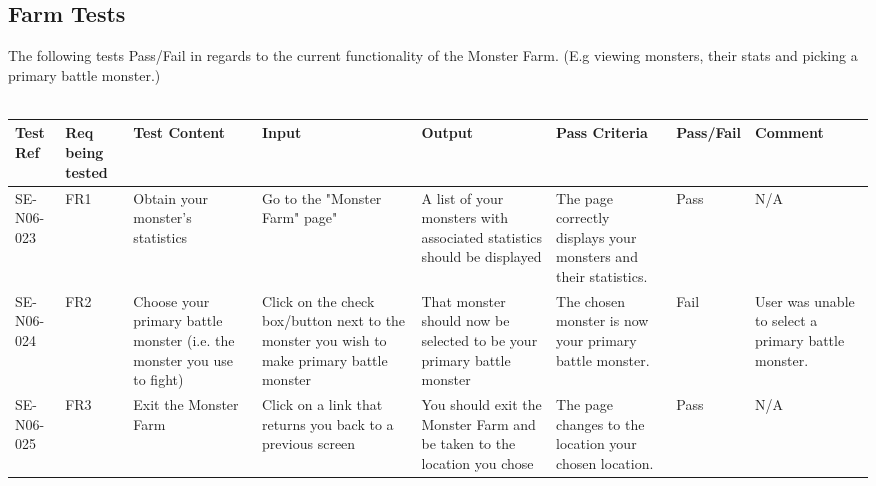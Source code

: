\documentclass[titlepage]{article}
\begin{document}
{\subsection{Farm Tests} 
The following tests Pass/Fail in regards to the current functionality of the Monster Farm. (E.g viewing monsters, their stats and picking a primary battle monster.)\\
\\
\begin{sideways}
\begin{tabular}{|p{1cm}|p{1cm}|p{3cm}|p{3cm}|p{2cm}|p{3cm}|p{2cm}|p{2cm}|}
\hline
Test Ref & Req being tested & Test Content & Input & Output & Pass Criteria & Pass/Fail & Comment \\ 
\hline
SE-N06-023 & FR1 & Obtain your monster's statistics & Go to the "Monster Farm" page" & A list of your monsters with associated statistics should be displayed & The page correctly displays your monsters and their statistics. & Pass & N/A \\ 
\hline
SE-N06-024 & FR2 & Choose your primary battle monster (i.e. the monster you use to fight) & Click on the check box/button next to the monster you wish to make primary battle monster & That monster should now be selected to be your primary battle monster& The chosen monster is now your primary battle monster. & Fail & User was unable to select a primary battle monster. \\ 
\hline 
SE-N06-025 & FR3 & Exit the Monster Farm & Click on a link that returns you back to a previous screen & You should exit the Monster Farm and be taken to the location you chose & The page changes to the location your chosen location. & Pass & N/A \\ 
\hline 
\end{tabular}
\end{sideways}
}
\end{document}
